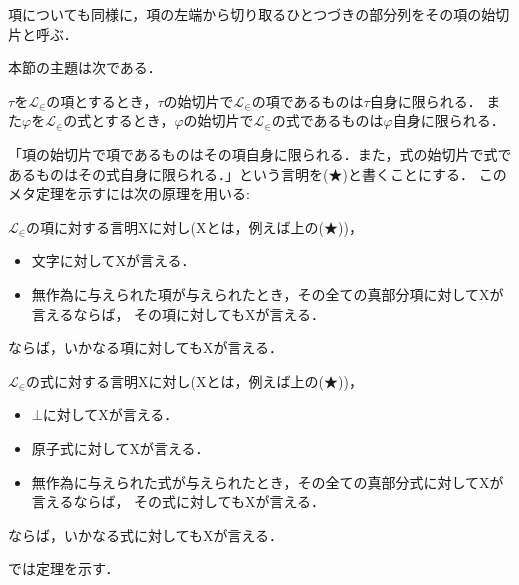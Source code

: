 	項についても同様に，項の左端から切り取るひとつづきの部分列をその項の始切片と呼ぶ．
	
	本節の主題は次である．
	\begin{screen}
		\begin{metathm}[始切片の一意性]\label{metathm:initial_segment_L_in}
			$\tau$を$\mathcal{L}_{\in}$の項とするとき，$\tau$の始切片で$\mathcal{L}_{\in}$の項であるものは$\tau$自身に限られる．
			また$\varphi$を$\mathcal{L}_{\in}$の式とするとき，$\varphi$の始切片で$\mathcal{L}_{\in}$の式であるものは$\varphi$自身に限られる．
		\end{metathm}
	\end{screen}
	
	「項の始切片で項であるものはその項自身に限られる．また，式の始切片で式であるものはその式自身に限られる．」という言明を(★)と書くことにする．
	このメタ定理を示すには次の原理を用いる:
	
	\begin{screen}
		\begin{metaaxm}
			$\mathcal{L}_{\in}$の項に対する言明Xに対し(Xとは，例えば上の(★))，
			\begin{itemize}
				\item 文字に対してXが言える．
				\item 無作為に与えられた項が与えられたとき，その全ての真部分項に対してXが言えるならば，
					その項に対してもXが言える．
			\end{itemize}
			ならば，いかなる項に対してもXが言える．
		\end{metaaxm}
	\end{screen}
	
	\begin{screen}
		\begin{metaaxm}
			$\mathcal{L}_{\in}$の式に対する言明Xに対し(Xとは，例えば上の(★))，
			\begin{itemize}
				\item $\bot$に対してXが言える．
				\item 原子式に対してXが言える．
				\item 無作為に与えられた式が与えられたとき，その全ての真部分式に対してXが言えるならば，
					その式に対してもXが言える．
			\end{itemize}
			ならば，いかなる式に対してもXが言える．
		\end{metaaxm}
	\end{screen}
	
	では定理を示す．
	
